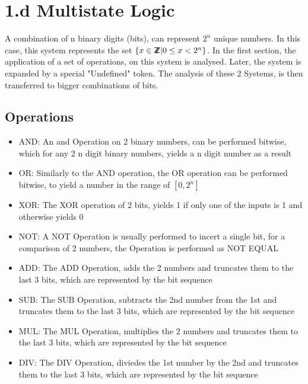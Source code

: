 \documentclass{aiaa-tc}
\newcommand*{\ZZ}{%
  \textsf{Z\kern-1ex Z}%
}
\begin{document}
\section{1.d Multistate Logic}
A combination of n binary digits (bits), can represent $2^n$ unique numbers. In this case, this system represents the set $ \{ x \in \ZZ | 0 \leq x < 2^n \} $.
In the first section, the application of a set of operations, on this system is analysed. Later, the system is expanded by a special "Undefined" token. The analysis of
these 2 Systems, is then transferred to bigger combinations of bits.

\subsection{Operations}
\begin{itemize}
    \item AND: An and Operation on 2 binary numbers, can be performed bitwise, which for any 2 n digit binary numbers, yields a n digit number as a result
    \item OR: Similarly to the AND operation, the OR operation can be performed bitwise, to yield a number in the range of $[0, 2^n]$
    \item XOR: The XOR operation of 2 bits, yields 1 if only one of the inputs is 1 and otherwise yields 0
    \item NOT: A NOT Operation is usually performed to incert a single bit, for a comparison of 2 numbers, the Operation is performed as NOT EQUAL
    \item ADD: The ADD Operation, adds the 2 numbers and truncates them to the last 3 bits, which are represented by the bit sequence
    \item SUB: The SUB Operation, subtracts the 2nd number from the 1st and truncates them to the last 3 bits, which are represented by the bit sequence
    \item MUL: The MUL Operation, multiplies the 2 numbers and truncates them to the last 3 bits, which are represented by the bit sequence
    \item DIV: The DIV Operation, diviedes the 1st number by the 2nd and truncates them to the last 3 bits, which are represented by the bit sequence
\end{itemize}
\end{document}

